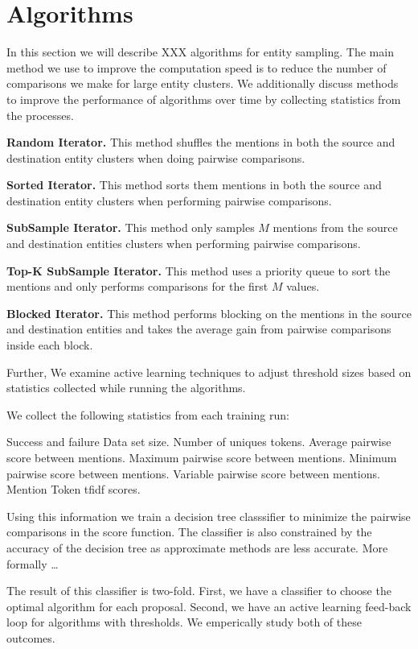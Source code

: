 
\section{Algorithms}

In this section we will describe XXX algorithms for entity sampling.
The main method we use to improve the computation speed is to reduce the
number of comparisons we make for large entity clusters.
We additionally discuss methods to improve the performance of algorithms
over time by collecting statistics from the processes.

\textbf{Random Iterator.} This method shuffles the mentions in both the
source and destination entity clusters when doing pairwise comparisons. 

\textbf{Sorted Iterator.} This method sorts them mentions in both the source
and destination entity clusters when performing pairwise comparisons.

\textbf{SubSample Iterator.} This method only samples $M$ mentions from the
source and destination entities clusters when performing pairwise comparisons.

\textbf{Top-K SubSample Iterator.} This method uses a priority queue to sort
the mentions and only performs comparisons for the first $M$ values.

\textbf{Blocked Iterator.} This method performs blocking on the mentions in the
source and destination entities and takes the average gain from pairwise
comparisons inside each block.


Further, We examine active learning techniques to adjust threshold sizes based on statistics collected while running the algorithms.

We collect the following statistics from each training run:

Success and failure
Data set size.
Number of uniques tokens.
Average pairwise score between mentions.
Maximum pairwise score between mentions.
Minimum pairwise score between mentions.
Variable pairwise score between mentions.
Mention Token tfidf scores.

Using this information we train a decision tree classsifier to minimize the 
pairwise comparisons in the score function.
The classifier is also constrained by the accuracy of the decision tree as 
approximate methods are less accurate.
More formally \ldots

The result of this classifier is two-fold.
First, we have a classifier to choose the optimal algorithm for each proposal.
Second, we have an active learning feed-back loop for algorithms with 
thresholds.
We emperically study both of these outcomes.



